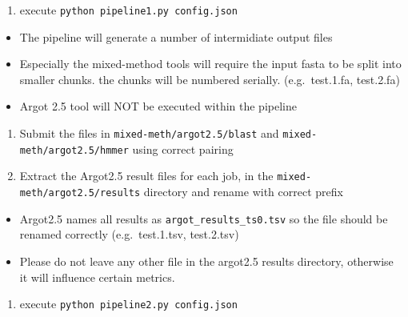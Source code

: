 \begin{enumerate}
 \def\labelenumi{\arabic{enumi}.}
 \setcounter{enumi}{2}

 \item
       execute \texttt{python\ pipeline1.py\ config.json}
\end{enumerate}

\begin{itemize}

 \item
       The pipeline will generate a number of intermidiate output files
 \item
       Especially the mixed-method tools will require the input fasta to be
       split into smaller chunks. the chunks will be numbered serially.
       (e.g.~test.1.fa, test.2.fa)
 \item
       Argot 2.5 tool will NOT be executed within the pipeline
\end{itemize}

\begin{enumerate}
 \def\labelenumi{\arabic{enumi}.}
 \setcounter{enumi}{3}

 \item
       Submit the files in \texttt{mixed-meth/argot2.5/blast} and
       \texttt{mixed-meth/argot2.5/hmmer} using correct pairing
 \item
       Extract the Argot2.5 result files for each job, in the
       \texttt{mixed-meth/argot2.5/results} directory and rename with correct
       prefix
\end{enumerate}

\begin{itemize}

 \item
       Argot2.5 names all results as \texttt{argot\_results\_ts0.tsv} so the
       file should be renamed correctly (e.g.~test.1.tsv, test.2.tsv)
 \item
       Please do not leave any other file in the argot2.5 results directory,
       otherwise it will influence certain metrics.
\end{itemize}

\begin{enumerate}
 \def\labelenumi{\arabic{enumi}.}
 \setcounter{enumi}{5}

 \item
       execute \texttt{python\ pipeline2.py\ config.json}
\end{enumerate}
